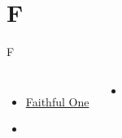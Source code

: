 \documentclass[aspectratio=169]{beamer}
\begin{document}
\section{ F }

\begin{frame}[t]{F}
\begin{columns}[t]
\begin{itemize}
    \item \hyperlink{Faithful One[]}{Faithful One}
    \item[] \phantom{1}
\end{itemize}
\begin{itemize}
    \item[] \phantom{1}
\end{itemize}
\end{columns}
\end{frame}
\end{document}
